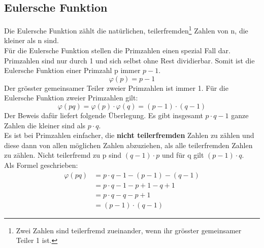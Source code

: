 \subsection{Eulersche Funktion}

Die Eulersche Funktion zählt die natürlichen, teilerfremden\footnote{Zwei Zahlen sind teilerfremd zueinander, wenn ihr grösster gemeinsamer Teiler 1 ist.}  Zahlen von n, die kleiner als n sind.\\
Für die Eulersche Funktion stellen die Primzahlen einen spezial Fall dar.
Primzahlen sind nur durch 1 und sich selbst ohne Rest dividierbar. Somit ist die Eulersche Funktion einer Primzahl p immer $p - 1$. 
%
\begin{equation*}
  \varphi(p) = p - 1
\end{equation*}
%
Der grösster gemeinsamer Teiler zweier Primzahlen ist immer 1.
Für die Eulersche Funktion zweier Primzahlen gilt:
\begin{equation}
  \varphi(pq) = \varphi(p) \cdot \varphi(q) = (p - 1) \cdot (q - 1)
  \label{eqn:eulersche_func}
\end{equation}
Der Beweis dafür liefert folgende Überlegung. Es gibt insgesamt $p \cdot q -1$ ganze Zahlen die kleiner sind als $p \cdot q$.\\
Es ist bei Primzahlen einfacher, die \textbf{nicht teilerfremden} Zahlen zu zählen und diese dann von allen möglichen Zahlen abzuziehen, als alle teilerfremden Zahlen zu zählen. Nicht teilerfremd zu p sind $(q - 1) \cdot p$ und für q gilt $ (p - 1) \cdot q$. \cite{kryptologie}\\
Als Formel geschrieben:
%
\begin{equation*}
  \begin{split}
    \varphi(pq) & = p \cdot q -1 - (p - 1) - (q - 1)  \\
     & = p \cdot q -1 - p + 1 - q + 1  \\
     & = p \cdot q -q - p + 1  \\
     & = (p -1) \cdot (q - 1)
    \label{eqn:herleitung_eulersche_func}
  \end{split}
\end{equation*}
%
